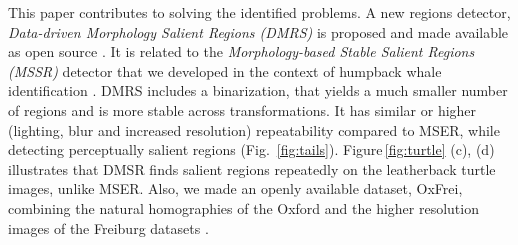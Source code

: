 \documentclass{article}
\begin{document}
This paper contributes to solving the identified problems. A new regions detector, {\em Data-driven Morphology Salient Regions (DMRS)} is proposed and made available as open source \cite{elena_ranguelova_2016_45156}. It is related to the {\em Morphology-based Stable Salient Regions (MSSR)} detector that we developed in the context of humpback whale identification \cite{RangMSSR06, RangHumpb06}. DMRS includes a binarization, %
that yields a much smaller number of regions and is more stable across transformations. It has similar or higher (lighting, blur and increased resolution) repeatability compared to MSER, while detecting %
perceptually salient regions (Fig.~\ref{fig:tails}). Figure\,\ref{fig:turtle} (c), (d) illustrates that DMSR finds salient regions repeatedly on the leatherback turtle images, unlike MSER. Also, we made an openly available dataset, OxFrei, combining the natural homographies of the Oxford and the higher resolution images of the Freiburg datasets \cite{elena_ranguelova_2016_45156}.
\end{document}
